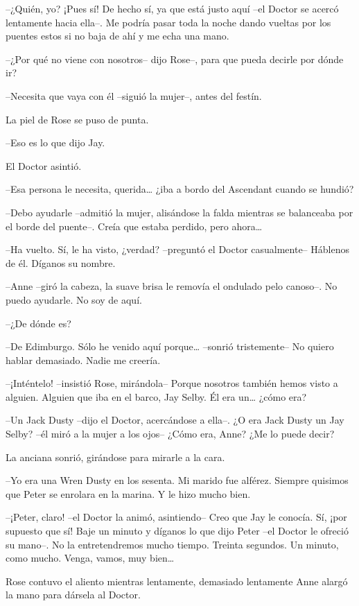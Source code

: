 {--¿Quién, yo? ¡Pues sí! De hecho sí, ya que está justo aquí --el Doctor
 se acercó lentamente hacia ella--. Me podría pasar toda la noche dando
vueltas por los puentes estos si no baja de ahí y me echa una mano.}

{--¿Por qué no viene con nosotros-- dijo Rose--, para que pueda decirle
por dónde ir?}

{--Necesita que vaya con él --siguió la mujer--, antes del festín.}

{La piel de Rose se puso de punta.}

{--Eso es lo que dijo Jay.}

{El Doctor asintió.}

{--Esa persona le necesita, querida\ldots{} ¿iba a bordo del Ascendant
cuando se hundió?}

{--Debo ayudarle --admitió la mujer, alisándose la falda mientras se
 balanceaba por el borde del puente--. Creía que estaba perdido, pero
 ahora\ldots{}}

{--Ha vuelto. Sí, le ha visto, ¿verdad? --preguntó el Doctor
casualmente-- Háblenos de él. Díganos su nombre.}

{--Anne --giró la cabeza, la suave brisa le removía el ondulado pelo
canoso--. No puedo ayudarle. No soy de aquí.}

{--¿De dónde es?}

{--De Edimburgo. Sólo he venido aquí porque\ldots{} --sonrió
tristemente-- No quiero hablar demasiado. Nadie me creería.}

{--¡Inténtelo! --insistió Rose, mirándola-- Porque nosotros también
 hemos visto a alguien. Alguien que iba en el barco, Jay Selby. Él era
 un\ldots{} ¿cómo era?}

{--Un Jack Dusty --dijo el Doctor, acercándose a ella--. ¿O era Jack
 Dusty un Jay Selby? --él miró a la mujer a los ojos-- ¿Cómo era, Anne?
¿Me lo puede decir?}

{La anciana sonrió, girándose para mirarle a la cara.}

{--Yo era una Wren Dusty en los sesenta. Mi marido fue alférez. Siempre
quisimos que Peter se enrolara en la marina. Y le hizo mucho bien.}

{--¡Peter, claro! --el Doctor la animó, asintiendo-- Creo que Jay le
 conocía. Sí, ¡por supuesto que sí! Baje un minuto y díganos lo que dijo
 Peter --el Doctor le ofreció su mano--. No la entretendremos mucho
 tiempo. Treinta segundos. Un minuto, como mucho. Venga, vamos, muy
 bien\ldots{}}

{Rose contuvo el aliento mientras lentamente, demasiado lentamente Anne
alargó la mano para dársela al Doctor.}

